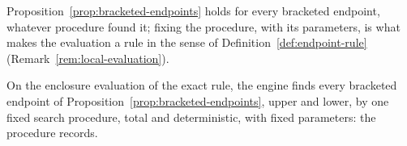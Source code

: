 
Proposition~\ref{prop:bracketed-endpoints} holds for every bracketed
endpoint, whatever procedure found it; fixing the procedure, with its
parameters, is what makes the evaluation a rule in the sense of
Definition~\ref{def:endpoint-rule} (Remark~\ref{rem:local-evaluation}).

\begin{requirement}\label{req:search-procedure}
On the enclosure evaluation of the exact rule, the engine finds every
bracketed endpoint of Proposition~\ref{prop:bracketed-endpoints}, upper and
lower, by one fixed search procedure, total and deterministic, with fixed
parameters: the procedure  records.
\end{requirement}
